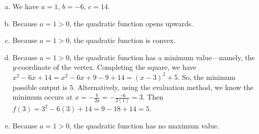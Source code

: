 \documentclass[11pt,letterpaper]{article}
\begin{document}
{\itshape
	\begin{enumerate}[(a)]
	\item We have $a= 1$, $b= -6$, $c= 14$.
	\item Because $a= 1 > 0$, the quadratic function opens upwards.
	\item Because $a= 1 > 0$, the quadratic function is convex. 
	\item Because $a= 1 > 0$, the quadratic function has a minimum value---namely, the $y$-coordinate of the vertex. Completing the square, we have $x^2 - 6x + 14= x^2 - 6x + 9 - 9 + 14= (x - 3)^2 + 5$. So, the minimum possible output is $5$. Alternatively, using the evaluation method, we know the minimum occurs at $x= -\tfrac{b}{2a}= -\tfrac{-6}{2(1)}= 3$. Then $f(3)= 3^2 - 6(3) + 14= 9 - 18 + 14= 5$.
	\item Because $a= 1 > 0$, the quadratic function has no maximum value. 
	\end{enumerate}
}
\end{document}
